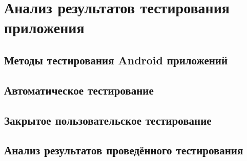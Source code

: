\chapter{Анализ результатов тестирования приложения}
\section{Методы тестирования Android приложений}

\section{Автоматическое тестирование}

\section{Закрытое пользовательское тестирование}

\section{Анализ результатов проведённого тестирования}